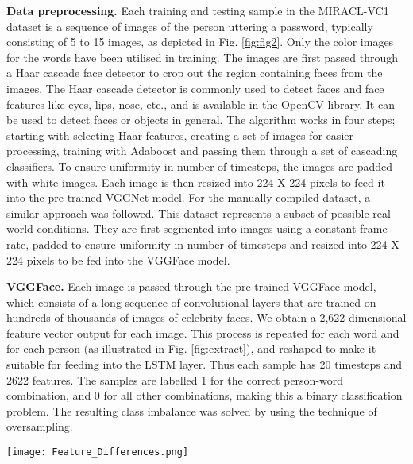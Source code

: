 \documentclass[letterpaper]{article}
\begin{document}
\vspace{1em}
\noindent\textbf{Data preprocessing. }
Each training and testing sample in the MIRACL-VC1 dataset is a sequence of images of the person uttering a password, typically consisting of 5 to 15 images, as depicted in Fig. \ref{fig:fig2}. Only the color images for the words have been utilised in training. The images are first passed through a Haar cascade face detector \cite{article} to crop out the region containing faces from the images.
The Haar cascade detector is commonly used to detect faces and face features like eyes, lips, nose, etc., and is available in the OpenCV library. It can be used to detect faces or objects in general. The algorithm works in four steps; starting with selecting Haar features, creating a set of images for easier processing, training with Adaboost and passing them through a set of cascading classifiers.
To ensure uniformity in number of timesteps, the images are padded with white images. Each image is then resized into 224 X 224 pixels to feed it into the pre-trained VGGNet model. 
For the manually compiled dataset, a similar approach was followed. This dataset represents a subset of possible real world conditions. They are first segmented into images using a constant frame rate, padded to ensure uniformity in number of timesteps and resized into 224 X 224 pixels to be fed into the VGGFace model.



\vspace{1em}
\noindent\textbf{VGGFace. }
Each image is passed through the pre-trained VGGFace model, which consists of a long sequence of convolutional layers that are trained on hundreds of thousands of images of celebrity faces. We obtain a 2,622 dimensional feature vector output for each image. This process is repeated for each word and for each person (as illustrated in Fig. \ref{fig:extract}), and reshaped to make it suitable for feeding into the LSTM layer. Thus each sample has 20 timesteps and 2622 features. The samples are labelled 1 for the correct person-word combination, and 0 for all other combinations, making this a binary classification problem. The resulting class imbalance was solved by using the technique of oversampling. 

\begin{figure*}[ht]
    \centering
    \texttt{[image: Feature\_Differences.png]}
    \caption{Variations in Features Extracted using VGGFace}
    \label{fig:extract}
\end{figure*}
\end{document}
